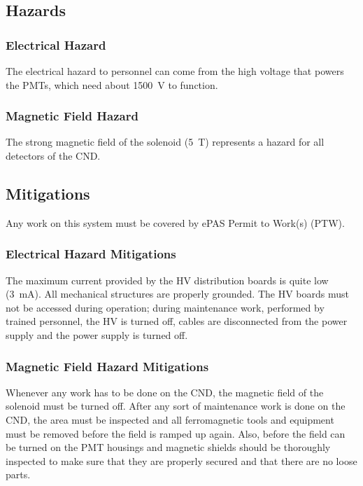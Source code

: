 \subsection{Hazards} 

\subsubsection{Electrical Hazard}

The electrical hazard to personnel can come from the high voltage that powers the PMTs, which 
need about 1500~V to function. 

\subsubsection{Magnetic Field Hazard}

The strong magnetic field of the solenoid (5~T) represents a hazard for all detectors of the
CND.

\subsection{Mitigations}
Any work on this system must be covered by ePAS Permit to Work(s) (PTW).

\subsubsection{Electrical Hazard Mitigations} 

The maximum current provided by the HV distribution boards is quite low (3~mA). All mechanical 
structures are properly grounded. The HV boards must not be accessed during operation; during 
maintenance work, performed by trained personnel, the HV is turned off, cables are disconnected 
from the power supply and the power supply is turned off. 

\subsubsection{Magnetic Field Hazard Mitigations}

Whenever any work has to be done on the CND, the magnetic field of the solenoid must be turned 
off. After any sort of maintenance work is done on the CND, the area must be inspected and all 
ferromagnetic tools and equipment must be removed before the field is ramped up again. Also, 
before the field can be turned on the PMT housings and magnetic shields should be thoroughly 
inspected to make sure that they are properly secured and that there are no loose parts. 

